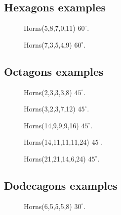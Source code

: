 \documentclass[11pt]{article}
\begin{document}
\subsection{Hexagons examples}

\begin{figure}[H]
\centering
{}
\caption{Horns(5,8,7,0,11) $60^\circ$.}
\end{figure}

\begin{figure}[H]
\centering
{}
\caption{Horns(7,3,5,4,9) $60^\circ$.}
\end{figure}




\subsection{Octagons examples}

\begin{figure}[H]
\centering
{}
\caption{Horns(2,3,3,3,8) $45^\circ$.}
\end{figure}

\begin{figure}[H]
\centering
{}
\caption{Horns(3,2,3,7,12) $45^\circ$.}
\end{figure}

\begin{figure}[H]
\centering
{}
\caption{Horns(14,9,9,9,16) $45^\circ$.}
\end{figure}

\begin{figure}[H]
\centering
{}
\caption{Horns(14,11,11,11,24) $45^\circ$.}
\end{figure}

\begin{figure}[H]
\centering
{}
\caption{Horns(21,21,14,6,24) $45^\circ$.}
\end{figure}


\subsection{Dodecagons examples}

\begin{figure}[H]
\centering
{}
\caption{Horns(6,5,5,5,8) $30^\circ$.}
\end{figure}
\end{document}
